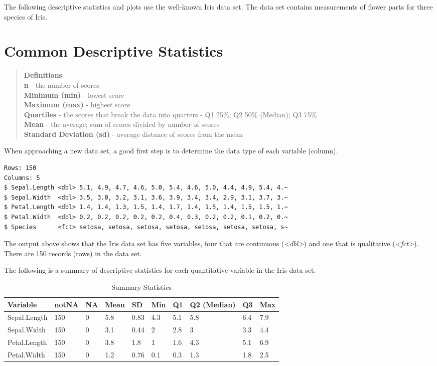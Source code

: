 \documentclass[
]{book}
\begin{document}
The following descriptive statistics and plots use the well-known Iris data set. The data set contains measurements of flower parts for three species of Iris.

\section{Common Descriptive Statistics}\label{common-descriptive-statistics}

\begin{quote}
\textbf{Definitions}\\
\textbf{n} - the number of scores\\
\textbf{Minimum (min)} - lowest score\\
\textbf{Maximum (max)} - highest score\\
\textbf{Quartiles} - the scores that break the data into quarters - Q1 25\%; Q2 50\% (Median); Q3 75\%\\
\textbf{Mean} - the average; sum of scores divided by number of scores\\
\textbf{Standard Deviation (sd)} - average distance of scores from the mean
\end{quote}

When approaching a new data set, a good first step is to determine the data type of each variable (column).

\begin{verbatim}
Rows: 150
Columns: 5
$ Sepal.Length <dbl> 5.1, 4.9, 4.7, 4.6, 5.0, 5.4, 4.6, 5.0, 4.4, 4.9, 5.4, 4.~
$ Sepal.Width  <dbl> 3.5, 3.0, 3.2, 3.1, 3.6, 3.9, 3.4, 3.4, 2.9, 3.1, 3.7, 3.~
$ Petal.Length <dbl> 1.4, 1.4, 1.3, 1.5, 1.4, 1.7, 1.4, 1.5, 1.4, 1.5, 1.5, 1.~
$ Petal.Width  <dbl> 0.2, 0.2, 0.2, 0.2, 0.2, 0.4, 0.3, 0.2, 0.2, 0.1, 0.2, 0.~
$ Species      <fct> setosa, setosa, setosa, setosa, setosa, setosa, setosa, s~
\end{verbatim}

The output above shows that the Iris data set has five variables, four that are continuous (\emph{\textless dbl\textgreater{}}) and one that is qualitative (\emph{\textless fct\textgreater{}}). There are 150 records (rows) in the data set.

The following is a summary of descriptive statistics for each quantitative variable in the Iris data set.

\begin{table}

\caption{\label{tab:unnamed-chunk-4}Summary Statistics}
\centering
\begin{tabular}[t]{llllllllll}
\toprule
Variable & notNA & NA & Mean & SD & Min & Q1 & Q2 (Median) & Q3 & Max\\
\midrule
Sepal.Length & 150 & 0 & 5.8 & 0.83 & 4.3 & 5.1 & 5.8 & 6.4 & 7.9\\
Sepal.Width & 150 & 0 & 3.1 & 0.44 & 2 & 2.8 & 3 & 3.3 & 4.4\\
Petal.Length & 150 & 0 & 3.8 & 1.8 & 1 & 1.6 & 4.3 & 5.1 & 6.9\\
Petal.Width & 150 & 0 & 1.2 & 0.76 & 0.1 & 0.3 & 1.3 & 1.8 & 2.5\\
\bottomrule
\end{tabular}
\end{table}
\end{document}
